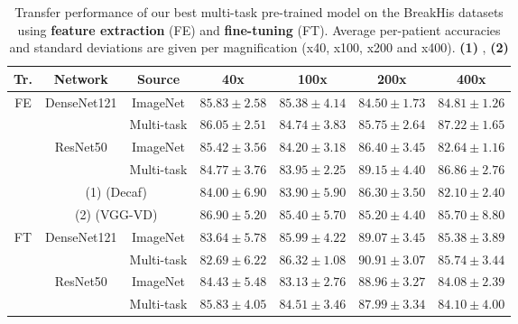 \begin{table}
    \centering
    \small
    \begin{tabular}{|c|c|c|cccc|}
        \hline
        Tr. & Network & Source & 40x & 100x & 200x & 400x \\
        \hline
\multirow{6}{*}{FE} & \multirow{2}{*}{DenseNet121} & ImageNet & $85.83 \pm 2.58$ & $85.38 \pm 4.14$ & $84.50 \pm 1.73$ & $84.81 \pm 1.26$\\
& & Multi-task & $86.05 \pm 2.51$ & $84.74 \pm 3.83$ & $85.75 \pm 2.64$ & $87.22 \pm 1.65$\\
\cline{2-7}
& \multirow{2}{*}{ResNet50} & ImageNet & $85.42 \pm 3.56$ & $84.20 \pm 3.18$ & $86.40 \pm 3.45$ & $82.64 \pm 1.16$\\
& & Multi-task & $84.77 \pm 3.76$ & $83.95 \pm 2.25$ & $89.15 \pm 4.40$ & $86.86 \pm 2.76$\\
\cline{2-7}
&  \multicolumn{2}{c|}{(1) (Decaf)} &  $84.00 \pm 6.90 $ & $83.90  \pm 5.90$ & $86.30 \pm 3.50$ & $82.10 \pm 2.40$ \\
& \multicolumn{2}{c|}{(2) (VGG-VD)} & $86.90 \pm 5.20$ & $85.40 \pm 5.70$ & $85.20 \pm 4.40$ & $85.70 \pm 8.80$ \\
\hline
\multirow{4}{*}{FT} & \multirow{2}{*}{DenseNet121} & ImageNet & $83.64 \pm 5.78$ & $85.99 \pm 4.22$ & $89.07 \pm 3.45$ & $85.38 \pm 3.89$\\
& & Multi-task & $82.69 \pm 6.22$ & $86.32 \pm 1.08$ & $90.91 \pm 3.07$ & $85.74 \pm 3.44$\\
\cline{2-7}
& \multirow{2}{*}{ResNet50} & ImageNet & $84.43 \pm 5.48$ & $83.13 \pm 2.76$ & $88.96 \pm 3.27$ & $84.08 \pm 2.39$\\
& & Multi-task & $85.83 \pm 4.05$ & $84.51 \pm 3.46$ & $87.99 \pm 3.34$ & $84.10 \pm 4.00$\\
        \hline
    \end{tabular}
    \caption{Transfer performance of our best multi-task pre-trained model on the BreakHis datasets using \textbf{feature extraction} (FE) and \textbf{fine-tuning} (FT). Average per-patient accuracies and standard deviations are given per magnification (x40, x100, x200 and x400). \textbf{(1)} \cite{spanhol2017deep}, \textbf{(2)} \cite{song2017supervised}}
    \label{tab:mtask:breakhis_eval}
\end{table}

